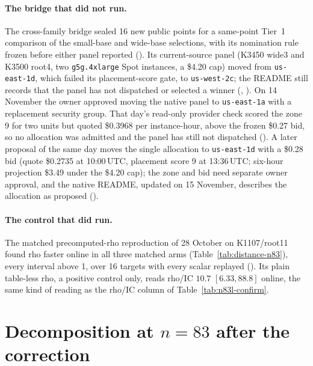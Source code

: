\paragraph{The bridge that did not run.} The cross-family bridge sealed 16
new public points for a same-point Tier~1 comparison of the small-base and
wide-base selections, with its nomination rule frozen before either panel
reported (). Its
current-source panel (K3450 wide3 and K3500 root4, two \texttt{g5g.4xlarge}
Spot instances, a \$4.20 cap) moved from \texttt{us-east-1d}, which failed
its placement-score gate, to \texttt{us-west-2c}; the README still records
that the panel has not dispatched or selected a winner
(,
). On 14 November the owner approved
moving the native panel to \texttt{us-east-1a} with a replacement security
group. That day's read-only provider check scored the zone 9 for two units
but quoted \$0.3968 per instance-hour, above the frozen \$0.27 bid, so no
allocation was admitted and the panel has still not dispatched
(). A later proposal of the same day moves the single
allocation to \texttt{us-east-1d} with a \$0.28 bid (quote \$0.2735 at
10:00\,UTC, placement score 9 at 13:36\,UTC; six-hour projection \$3.49 under
the \$4.20 cap); the zone and bid need separate owner approval, and the
native README, updated on 15 November, describes the allocation as proposed
().

\paragraph{The control that did run.} The matched precomputed-rho
reproduction of 28 October on K1107/root11 found rho faster online in all
three matched arms (Table~\ref{tab:distance-n83}), every interval above 1,
over 16 targets with every scalar replayed
(). Its plain
table-less rho, a positive control only, reads rho/IC $10.7$
$[6.33,88.8]$ online, the same kind of reading as the rho/IC column of
Table~\ref{tab:n83l-confirm}.

\section{Decomposition at $n=83$ after the correction}\label{sec:n83l-sat}

